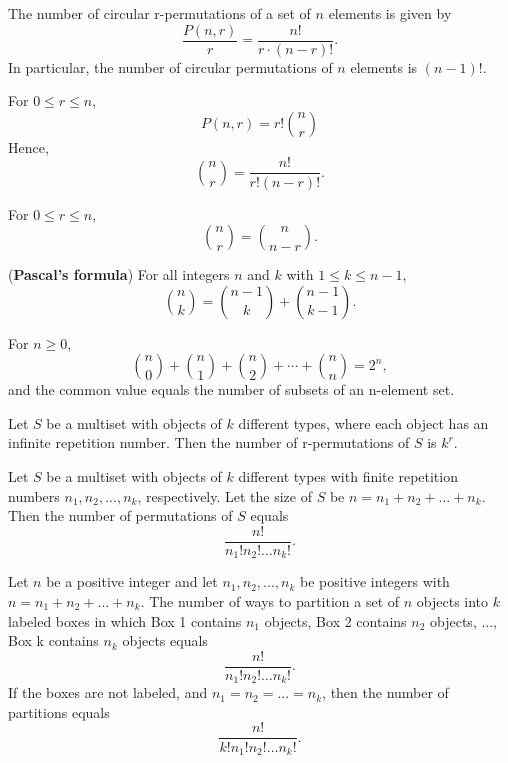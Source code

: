 \begin{theorem}
    \label{thm:2.2.2}
    The number of circular r-permutations of a set of $n$ elements is given by 
    \[\frac{P(n,r)}{r}=\frac{n!}{r\cdot(n-r)!}.\]
    In particular, the number of circular permutations of $n$ elements is $(n - 1)!$.
\end{theorem}

\begin{theorem}
    \label{thm:2.3.1} 
    For $0\leq r \leq n$,
    \[P(n,r)=r!\binom{n}{r}\]
    Hence, 
    \[\binom{n}{r} = \frac{n!}{r! (n-r)!}.\]
\end{theorem}

\begin{corollary}
    \label{cor:2.3.2}
    For $0 \leq r \leq n$,
    \[\binom{n}{r} = \binom{n}{n-r}.\]
\end{corollary}

\begin{theorem}
    \label{thm:2.3.3}
    (\textbf{Pascal's formula}) For all integers $n$ and $k$ with $1 \leq k \leq n-1$,
    \[\binom{n}{k} = \binom{n-1}{k} + \binom{n-1}{k-1}.\]
\end{theorem}

\begin{theorem}
    \label{thm:2.3.4}
    For $n \geq 0$,
    \[\binom{n}{0} + \binom{n}{1} + \binom{n}{2} + \cdots + \binom{n}{n} = 2 ^ {n},\]
    and the common value equals the number of subsets of an n-element set.
\end{theorem}

\begin{theorem}
    \label{thm:2.4.1}
    Let $S$ be a multiset with objects of $k$ different types, where each object has an infinite repetition number. Then the number of r-permutations of $S$ is $k^{r}$.
\end{theorem}

\begin{theorem}
    \label{thm:2.4.2}
    Let $S$ be a multiset with objects of $k$ different types with finite repetition numbers $n_1, n_2, ... , n_k$, respectively. Let the size of $S$ be $n = n_1 + n_2 + ... + n_k$. Then the number of permutations of $S$ equals
    \[\frac{n!}{n_1!n_2!\dots n_k!}.\]
\end{theorem}

\begin{theorem}
    \label{thm:2.4.3}
    Let $n$ be a positive integer and let $n_1, n_2, ...  ,n_k$ be positive integers with $n = n_1 + n_2 + ... + n_k$. The number of ways to partition a set of $n$ objects into $k$ labeled boxes in which Box 1 contains $n_1$ objects, Box 2 contains $n_2$ objects, ..., Box k contains $n_k$ objects equals
    \[\frac{n!}{n_1!n_2!\dots n_k!}.\]
    If the boxes are not labeled, and $n_1 = n_2 = ... = n_k$, then the number of partitions equals
    \[\frac{n!}{k!n_1!n_2!\dots n_k!}.\]
\end{theorem}

